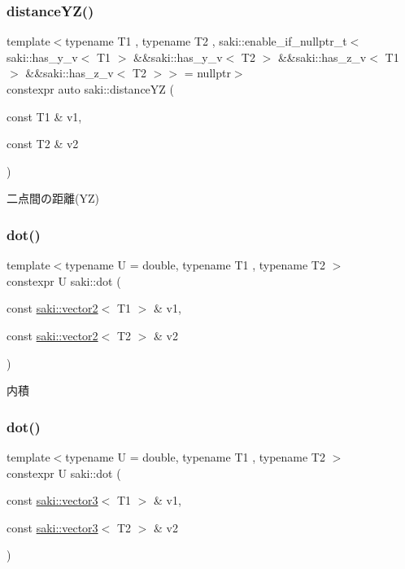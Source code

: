 \subsubsection{\texorpdfstring{distance\+Y\+Z()}{distanceYZ()}}
{\footnotesize\ttfamily template$<$typename T1 , typename T2 , saki\+::enable\+\_\+if\+\_\+nullptr\+\_\+t$<$ saki\+::has\+\_\+y\+\_\+v$<$ T1 $>$ \&\&saki\+::has\+\_\+y\+\_\+v$<$ T2 $>$ \&\&saki\+::has\+\_\+z\+\_\+v$<$ T1 $>$ \&\&saki\+::has\+\_\+z\+\_\+v$<$ T2 $>$$>$  = nullptr$>$ \\
constexpr auto saki\+::distance\+YZ (\begin{DoxyParamCaption}\item[{const T1 \&}]{v1,  }\item[{const T2 \&}]{v2 }\end{DoxyParamCaption})}



二点間の距離(\+Y\+Z) 

\mbox{\label{namespacesaki_a820a45ae402c8447bce4fee36a1f7d62}} 
\subsubsection{\texorpdfstring{dot()}{dot()}\hspace{0.1cm}{\footnotesize\ttfamily [1/3]}}
{\footnotesize\ttfamily template$<$typename U  = double, typename T1 , typename T2 $>$ \\
constexpr U saki\+::dot (\begin{DoxyParamCaption}\item[{const \mbox{\hyperlink{classsaki_1_1vector2}{saki\+::vector2}}$<$ T1 $>$ \&}]{v1,  }\item[{const \mbox{\hyperlink{classsaki_1_1vector2}{saki\+::vector2}}$<$ T2 $>$ \&}]{v2 }\end{DoxyParamCaption})}



内積 

\mbox{\label{namespacesaki_a5be905d72bf8dc80abc703fe69fa6fec}} 
\subsubsection{\texorpdfstring{dot()}{dot()}\hspace{0.1cm}{\footnotesize\ttfamily [2/3]}}
{\footnotesize\ttfamily template$<$typename U  = double, typename T1 , typename T2 $>$ \\
constexpr U saki\+::dot (\begin{DoxyParamCaption}\item[{const \mbox{\hyperlink{classsaki_1_1vector3}{saki\+::vector3}}$<$ T1 $>$ \&}]{v1,  }\item[{const \mbox{\hyperlink{classsaki_1_1vector3}{saki\+::vector3}}$<$ T2 $>$ \&}]{v2 }\end{DoxyParamCaption})}



